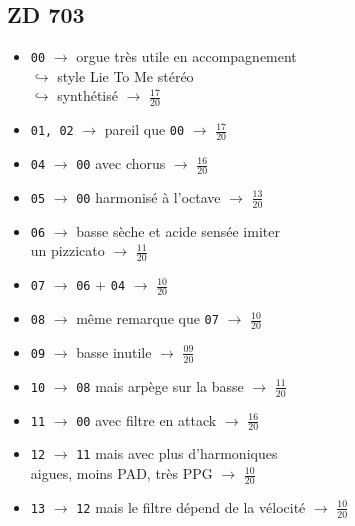 \documentclass[a4paper, 13pt]{article}
\begin{document}
\subsection*{ZD 703} 
\begin{itemize}
    \item \texttt{00} $\rightarrow$ orgue très utile en accompagnement  \\ $\hookrightarrow$ style Lie To Me stéréo \\ $\hookrightarrow$ synthétisé $\rightarrow$ \Large{$\frac{17}{20}$} \normalsize \vspace{0.2cm}
    \item \texttt{01, 02} $\rightarrow$ pareil que \texttt{00} $\rightarrow$ \Large{$\frac{17}{20}$} \normalsize \vspace{0.2cm}
    \item \texttt{04} $\rightarrow$ \texttt{00} avec chorus $\rightarrow$ \Large{$\frac{16}{20}$} \normalsize \vspace{0.2cm}
    \item \texttt{05} $\rightarrow$ \texttt{00} harmonisé à l'octave $\rightarrow$ \Large{$\frac{13}{20}$} \normalsize \vspace{0.2cm}
    \item \texttt{06} $\rightarrow$ basse sèche et acide sensée imiter \\ un pizzicato $\rightarrow$ \Large{$\frac{11}{20}$} \normalsize \vspace{0.2cm}
    \item \texttt{07} $\rightarrow$ \texttt{06} + \texttt{04} $\rightarrow$ \Large{$\frac{10}{20}$} \normalsize \vspace{0.2cm}
    \item \texttt{08} $\rightarrow$ même remarque que \texttt{07} $\rightarrow$ \Large{$\frac{10}{20}$} \normalsize \vspace{0.2cm}
    \item \texttt{09} $\rightarrow$ basse inutile $\rightarrow$ \Large{$\frac{09}{20}$} \normalsize \vspace{0.2cm}
    \item \texttt{10} $\rightarrow$ \texttt{08} mais arpège sur la basse $\rightarrow$ \Large{$\frac{11}{20}$} \normalsize \vspace{0.2cm}
    \item \texttt{11} $\rightarrow$ \texttt{00} avec filtre en attack $\rightarrow$ \Large{$\frac{16}{20}$} \normalsize \vspace{0.2cm}
    \item \texttt{12} $\rightarrow$ \texttt{11} mais avec plus d'harmoniques \\ aigues, moins PAD, très PPG $\rightarrow$ \Large{$\frac{10}{20}$} \normalsize \vspace{0.2cm}
    \item \texttt{13} $\rightarrow$ \texttt{12} mais le filtre dépend de la vélocité $\rightarrow$ \Large{$\frac{10}{20}$} \normalsize \vspace{0.2cm}
\end{itemize}
\end{document}
